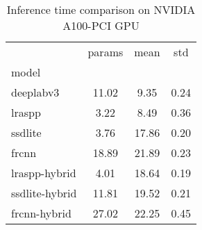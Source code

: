 \begin{table}[htbp]
\centering
\caption{Inference time comparison on NVIDIA A100-PCI GPU}
\label{tab:inf-time}
\begin{tabular}{lccc}
\toprule
 & params & mean & std \\
model &  &  &  \\
\midrule
deeplabv3 & 11.02 & 9.35 & 0.24 \\
lraspp & 3.22 & 8.49 & 0.36 \\
ssdlite & 3.76 & 17.86 & 0.20 \\
frcnn & 18.89 & 21.89 & 0.23 \\
lraspp-hybrid & 4.01 & 18.64 & 0.19 \\
ssdlite-hybrid & 11.81 & 19.52 & 0.21 \\
frcnn-hybrid & 27.02 & 22.25 & 0.45 \\
\bottomrule
\end{tabular}
\end{table}
